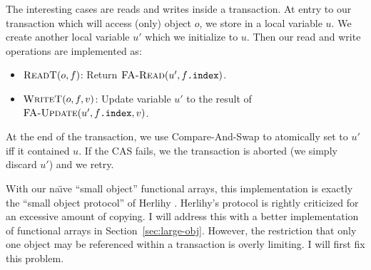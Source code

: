 The interesting cases are reads and writes inside a transaction.
At entry to our transaction which will access (only) object $o$, we
store  in a local variable $u$.  We create another
local variable $u'$ which we initialize to $u$.  Then our read and
write operations are implemented as:
\begin{itemize}
\item $\text{\sc ReadT}(o, f)$:
  Return $\text{\sc FA-Read}(u', f\text{\tt .index})$.
\item $\text{\sc WriteT}(o, f, v)$:
  Update variable $u'$ to the result of \linebreak
  $\text{\sc FA-Update}(u', f\text{\tt .index}, v)$.
\end{itemize}

At the end of the transaction, we use Compare-And-Swap to atomically
set  to $u'$ iff it contained $u$.  If the CAS fails,
we the transaction is aborted (we simply discard $u'$) and we retry.

With our na{\"\i}ve ``small object'' functional arrays, this implementation is
exactly the ``small object protocol'' of Herlihy \cite{Herlihy93}.
Herlihy's protocol is rightly criticized for an excessive amount of
copying.  I will address this with a better implementation of
functional arrays in Section~\ref{sec:large-obj}.
However, the restriction that only one object
may be referenced within a transaction is overly limiting.  I will
first fix this problem.

